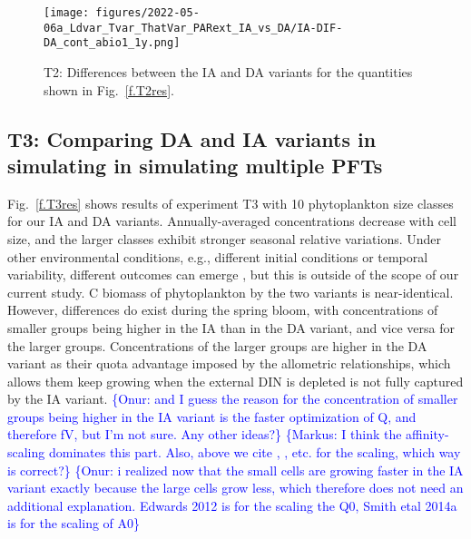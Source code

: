 \documentclass[gmd, manuscript]{copernicus}
\newcommand{\onur}[1]{\textcolor{blue}{\{Onur: #1\}}}
\newcommand{\markus}[1]{\textcolor{blue}{\{Markus: #1\}}}
\begin{document}
\begin{figure}[htb!]
\texttt{[image: figures/2022-05-06a\_Ldvar\_Tvar\_ThatVar\_PARext\_IA\_vs\_DA/IA-DIF-DA\_cont\_abio1\_1y.png]}
\caption{T2: Differences between the IA and DA variants for the quantities shown in Fig.~\ref{f.T2res}.\label{f.T2resdif}}
\end{figure}



\FloatBarrier%
\subsection{T3: Comparing DA and IA variants in simulating in simulating multiple PFTs}\label{s.resT3}

Fig.~\ref{f.T3res} shows results of experiment T3 with 10 phytoplankton size classes for our IA and DA variants. Annually-averaged concentrations decrease with cell size, and the larger classes exhibit stronger seasonal relative variations. Under other environmental conditions, e.g., different initial conditions or temporal variability, different outcomes can emerge \citep[see, e.g.,][]{Taherzadeh2017}, but this is outside of the scope of our current study. C biomass of phytoplankton by the two variants is near-identical.  However, differences do exist during the spring bloom, with concentrations of smaller groups being higher in the IA than in the DA variant, and vice versa for the larger groups. Concentrations of the larger groups are higher in the DA variant as their quota advantage imposed by the allometric relationships, which allows them keep growing when the external DIN is depleted \citep[i.e., the storage effect, see][]{Grover1991a,Litchman2009} is not fully captured by the IA variant.
\onur{and I guess the reason for the concentration of smaller groups being higher in the IA variant is the faster optimization of Q, and therefore fV, but I'm not sure. Any other ideas?} \markus{I think the affinity-scaling dominates this part.  Also, above we cite \citet{Edwards2012}, \citet{Smith2014a}, etc. for the scaling, which way is correct?} \onur{i realized now that the small cells are growing faster in the IA variant exactly because the large cells grow less, which therefore does not need an additional explanation. Edwards 2012 is for the scaling the Q0, Smith etal 2014a is for the scaling of A0}
\end{document}
